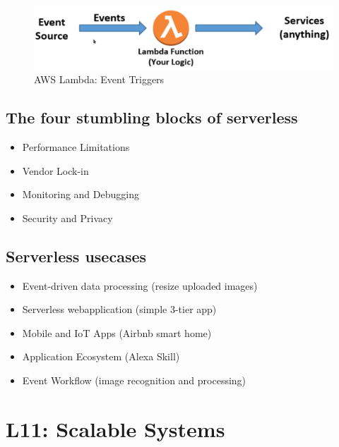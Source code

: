 \documentclass[a4paper]{article}
\begin{document}
\begin{multicols}{3}
\begin{figure}[H]
    \includegraphics[width=\linewidth]{AWSLambdaTrigger.png}
    \caption{AWS Lambda: Event Triggers}
    \label{fig:awslambda}
\end{figure}

\subsection{The four stumbling blocks of serverless}
\begin{itemize}
    \item Performance Limitations
    \item Vendor Lock-in
    \item Monitoring and Debugging
    \item Security and Privacy
\end{itemize}

\subsection{Serverless usecases}
\begin{itemize}
    \item Event-driven data processing (resize uploaded images)
    \item Serverless webapplication (simple 3-tier app)
    \item Mobile  and IoT Apps (Airbnb smart home)
    \item Application Ecosystem (Alexa Skill)
    \item Event Workflow (image recognition and processing)
\end{itemize}

\section{L11: Scalable Systems}


\end{multicols}
\end{document}
